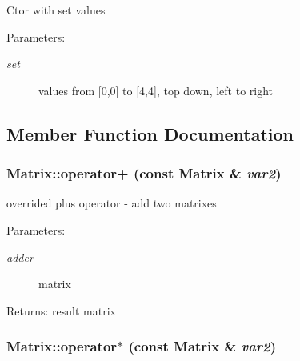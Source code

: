 Ctor with set values \begin{Desc}
\item[Parameters:]
\begin{description}
\item[{\em set}]values from \mbox{[}0,0\mbox{]} to \mbox{[}4,4\mbox{]}, top down, left to right \end{description}
\end{Desc}


\subsection{Member Function Documentation}
\hypertarget{class_matrix_2416ff4cd8a49a9621a659f5ee096272}{
\subsubsection[operator+]{ Matrix::operator+ (const {\bf Matrix} \& {\em var2})}}
\label{class_matrix_2416ff4cd8a49a9621a659f5ee096272}


overrided plus operator - add two matrixes \begin{Desc}
\item[Parameters:]
\begin{description}
\item[{\em adder}]matrix \end{description}
\end{Desc}
\begin{Desc}
\item[Returns:]result matrix \end{Desc}
\hypertarget{class_matrix_6d3597e20e658d0bc83432ab1587af04}{
\subsubsection[operator$\ast$]{ Matrix::operator$\ast$ (const {\bf Matrix} \& {\em var2})}}
\label{class_matrix_6d3597e20e658d0bc83432ab1587af04}


